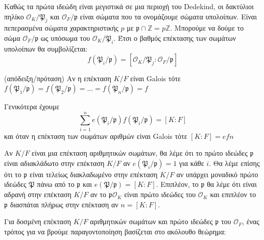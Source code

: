 \documentclass[oneside,a4paper]{article}
\newcommand {\tl}{\textlatin}
\newcommand{\Z}{\mathbb{Z}}
\begin{document}
Καθώς τα πρώτα ιδεώδη είναι μεγιστικά σε μια περιοχή του \tl{Dedekind}, οι δακτύλιοι πηλίκο $\mathcal{O}_K/\mathfrak{P}_j$ και $\mathcal{O}_F/\mathfrak{p}$ είναι σώματα που τα ονομάζουμε σώματα υπολοίπων. Είναι πεπερασμένα σώματα χαρακτηριστικής $p$ με $\mathfrak{p}\cap \Z = p \Z$. Μπορούμε να δούμε το σώμα $\mathcal{O}_F/\mathfrak{p}$ ως υπόσωμα του $\mathcal{O}_K/\mathfrak{P}_i$. Έτσι ο βαθμός επέκτασης των σωμάτων υπολοίπων θα συμβολίζεται:
$$f(\mathfrak{P}_i / \mathfrak{p}) = \left[\mathcal{O}_K/\mathfrak{P}_j : \mathcal{O}_F/\mathfrak{p}\right]$$


(απόδειξη/πρόταση) Αν η επέκταση $K/F$ είναι \tl{Galois} τότε $f(\mathfrak{P}_1 / \mathfrak{p}) = f(\mathfrak{P}_2 / \mathfrak{p}) = \ldots = f(\mathfrak{P}_n / \mathfrak{p}) = f$

Γενικότερα έχουμε $$\sum\limits_{i=1}^n e(\mathfrak{P}_i/\mathfrak{p}) f(\mathfrak{P}_i / \mathfrak{p}) = [K:F]$$ και όταν η επέκταση των σωμάτων αριθμών είναι \tl{Galois} τότε $[K:F] = efn$

Αν $K/F$ είναι μια επέκταση αριθμητικών σωμάτων, θα λέμε ότι το πρώτο ιδεώδες $\mathfrak{p}$ είναι αδιακλάδωτο στην επέκταση $K/F$ αν $e(\mathfrak{P}_i / \mathfrak{p}) = 1$ για κάθε $i$. Θα λέμε επίσης ότι το $\mathfrak{p}$ είναι τελείως διακλαδωμένο στην επέκταση $K/F$ αν υπάρχει μοναδικό πρώτο ιδεώδες $\mathfrak{P}$ πάνω από το $\mathfrak{p}$ και $e(\mathfrak{P}/\mathfrak{p}) = [K:F]$. Επιπλέον, το $\mathfrak{p}$ θα λέμε ότι είναι αδρανή στην επέκταση $K/F$ αν το $\mathfrak{p}\mathcal{O}_K$ είναι πρώτο ιδεώδες του $\mathcal{O}_K$ και επιπλέον το $\mathfrak{p}$ διασπάται πλήρως στην επέκταση αν $n = [K:F]$.


Για δοσμένη επέκταση $K/F$ αριθμητικών σωμάτων και πρώτο ιδεώδες $\mathfrak{p}$ του $\mathcal{O}_F$, ένας τρόπος για να βρούμε παραγοντοποίηση βασίζεται στο ακόλουθο θεώρημα:
\end{document}
